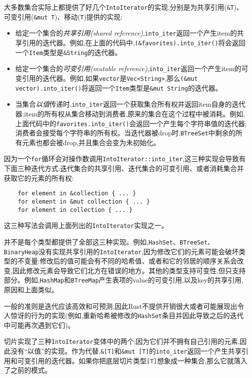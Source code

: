 大多数集合实际上都提供了好几个\texttt{IntoIterator}的实现,分别是为共享引用(\texttt{\&T})、可变引用(\texttt{\&mut T})、移动(\texttt{T})提供的实现:
\begin{itemize}
    \item 给定一个集合的\emph{共享引用(shared reference)},\texttt{into\_iter}返回一个产生item的共享引用的迭代器。例如,在上面的代码中,\texttt{(\&favorites).into\_iter()}将会返回一个\texttt{Item}类型是\texttt{\&String}的迭代器。
    \item 给定一个集合的\emph{可变引用(mutable reference)},\texttt{into\_iter}返回一个产生item的可变引用的迭代器。例如,如果\texttt{vector}是\texttt{Vec<String>},那么\texttt{(\&mut vector).into\_iter()}将返回一个\texttt{Item}类型是\texttt{\&mut String}的迭代器。
    \item 当集合\emph{以值}传递时,\texttt{into\_iter}返回一个获取集合所有权并返回item自身的迭代器;item的所有权从集合移动到消费者,原来的集合在这个过程中被消耗。例如,上面代码中的\texttt{favorites.into\_iter()}会返回一个产生每个字符串值的迭代器;消费者会接受每个字符串的所有权。当迭代器被drop时,\texttt{BTreeSet}中剩余的所有元素也都会被drop,并且集合会变为未初始化。
\end{itemize}

因为一个\texttt{for}循环会对操作数调用\texttt{IntoIterator::into\_iter},这三种实现会导致有下面三种迭代方式:迭代集合的共享引用、迭代集合的可变引用、或者消耗集合并获取它的元素的所有权:
\begin{verbatim}
    for element in &collection { ... }
    for element in &mut collection { ... }
    for element in collection { ... }
\end{verbatim}

这三种写法会调用上面列出的\texttt{IntoIterator}实现之一。

并不是每个类型都提供了全部这三种实现。例如,\texttt{HashSet}、\texttt{BTreeSet}、\texttt{BinaryHeap}没有实现共享引用的\texttt{IntoIterator},因为修改它们的元素可能会破坏类型的不变量:修改后的值可能会有不同的哈希值、或者和它的邻居的顺序关系会改变,因此修改元素会导致它们北方在错误的地方。其他的类型支持可变性,但只支持部分。例如,\texttt{HashMap}和\texttt{BTreeMap}产生表项的value的可变引用,以及key的共享引用,原因和上面类似。

一般的准则是迭代应该高效和可预测,因此Rust不提供开销很大或者可能展现出令人惊讶的行为的实现(例如,重新哈希被修改的\texttt{HashSet}条目并因此导致之后的迭代中可能再次遇到它们)。

切片实现了三种\texttt{IntoIterator}变体中的两个;因为它们并不拥有自己引用的元素,因此没有“以值”的实现。作为代替,\texttt{\&[T]}和\texttt{\&mut [T]}的\texttt{into\_iter}返回一个产生共享引用和可变引用的迭代器。如果你把底层切片类型\texttt{[T]}想象成一种集合,那么它就落入了之前的模式。

